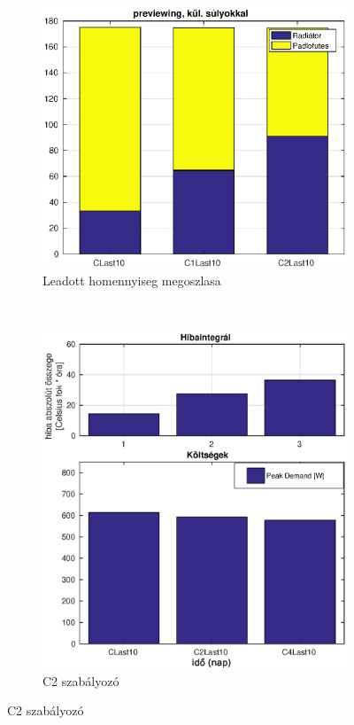 \begin{figure}[H]
	\begin{subfigure}[t]{0.48\textwidth}
		\centering
		\includegraphics[trim=0 0 0 0, clip,width=1.1\textwidth]{figures/onlab/constRefPrev/summaryEnergy}
		\caption{Leadott homennyiseg megoszlasa}
		\label{fig:constrefHeat}
	\end{subfigure}
	~
	\begin{subfigure}[t]{0.48\textwidth}
		\centering
		\includegraphics[trim=0 0 0 0, clip,width=1.1\textwidth]{figures/onlab/constRefPrev/summaryPeakDemand}
		\caption{C2 szabályozó}
		\label{fig:constrefPeak}
	\end{subfigure}
\end{figure}


